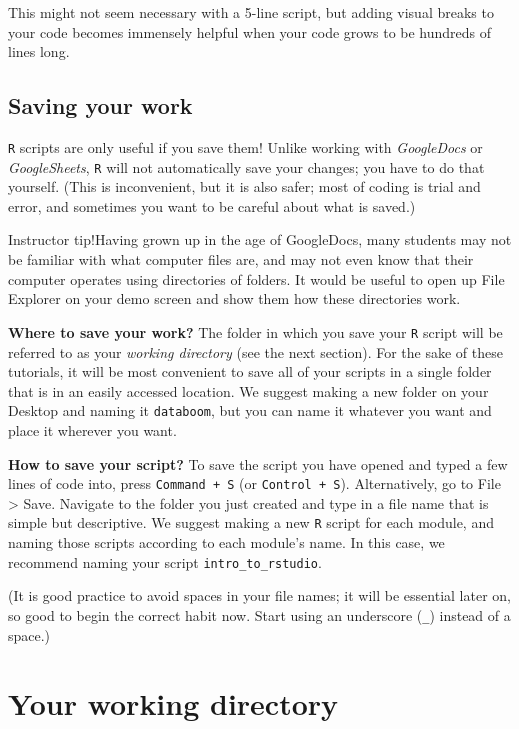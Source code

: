 \documentclass[
]{book}
\begin{document}
This might not seem necessary with a 5-line script, but adding visual breaks to your code becomes immensely helpful when your code grows to be hundreds of lines long.

\hypertarget{saving-your-work}{%
\subsection*{Saving your work}\label{saving-your-work}}

\texttt{R} scripts are only useful if you save them! Unlike working with \emph{GoogleDocs} or \emph{GoogleSheets}, \texttt{R} will not automatically save your changes; you have to do that yourself. (This is inconvenient, but it is also safer; most of coding is trial and error, and sometimes you want to be careful about what is saved.)

Instructor tip!Having grown up in the age of GoogleDocs, many students may not be familiar with what computer files are, and may not even know that their computer operates using directories of folders. It would be useful to open up File Explorer on your demo screen and show them how these directories work.

\textbf{Where to save your work?} The folder in which you save your \texttt{R} script will be referred to as your \emph{working directory} (see the next section). For the sake of these tutorials, it will be most convenient to save all of your scripts in a single folder that is in an easily accessed location. We suggest making a new folder on your Desktop and naming it \texttt{databoom}, but you can name it whatever you want and place it wherever you want.

\textbf{How to save your script?} To save the script you have opened and typed a few lines of code into, press \texttt{Command\ +\ S} (or \texttt{Control\ +\ S}). Alternatively, go to File \textgreater{} Save. Navigate to the folder you just created and type in a file name that is simple but descriptive. We suggest making a new \texttt{R} script for each module, and naming those scripts according to each module's name. In this case, we recommend naming your script \texttt{intro\_to\_rstudio}.

(It is good practice to avoid spaces in your file names; it will be essential later on, so good to begin the correct habit now. Start using an underscore (\texttt{\_}) instead of a space.)

\hypertarget{your-working-directory}{%
\section*{Your working directory}\label{your-working-directory}}
\end{document}
